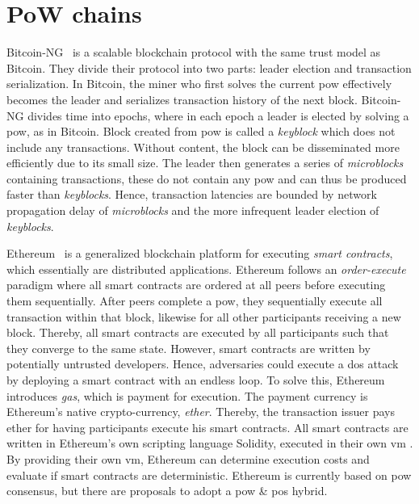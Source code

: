 \documentclass[USenglish]{uit-thesis}
\begin{document}
\section{PoW chains}
Bitcoin-NG~\cite{ng} is a scalable blockchain protocol with the same trust model as Bitcoin.
They divide their protocol into two parts: leader election and transaction serialization.
In Bitcoin, the miner who first solves the current \gls{pow} effectively becomes the leader and serializes transaction history of the next block.
Bitcoin-NG divides time into epochs, where in each epoch a leader is elected by solving a \gls{pow}, as in Bitcoin.
Block created from \gls{pow} is called a \textit{keyblock} which does not include any transactions.
Without content, the block can be disseminated more efficiently due to its small size.
The leader then generates a series of \textit{microblocks} containing transactions, these do not contain any \gls{pow} and can thus be produced faster than \textit{keyblocks}.
Hence, transaction latencies are bounded by network propagation delay of \textit{microblocks} and the more infrequent leader election of \textit{keyblocks}.


Ethereum~\cite{ether} is a generalized blockchain platform for executing \textit{smart contracts}, which essentially are distributed applications.
Ethereum follows an \textit{order-execute} paradigm where all smart contracts are ordered at all peers before executing them sequentially.
After peers complete a \gls{pow}, they sequentially execute all transaction within that block, likewise for all other participants receiving a new block.
Thereby, all smart contracts are executed by all participants such that they converge to the same state.
However, smart contracts are written by potentially untrusted developers.
Hence, adversaries could execute a \gls{dos} attack by deploying a smart contract with an endless loop.
To solve this, Ethereum introduces \textit{gas}, which is payment for execution.
The payment currency is Ethereum's native crypto-currency, \textit{ether}.
Thereby, the transaction issuer pays ether for having participants execute his smart contracts.
All smart contracts are written in Ethereum's own scripting language Solidity, executed in their own \gls{vm} \cite{ethervm, solidity}.
By providing their own \gls{vm}, Ethereum can determine execution costs and evaluate if smart contracts are deterministic.
Ethereum \cite{ether} is currently based on \gls{pow} consensus, but there are proposals \cite{casper} to adopt a \gls{pow} \& \gls{pos} hybrid.
\end{document}
